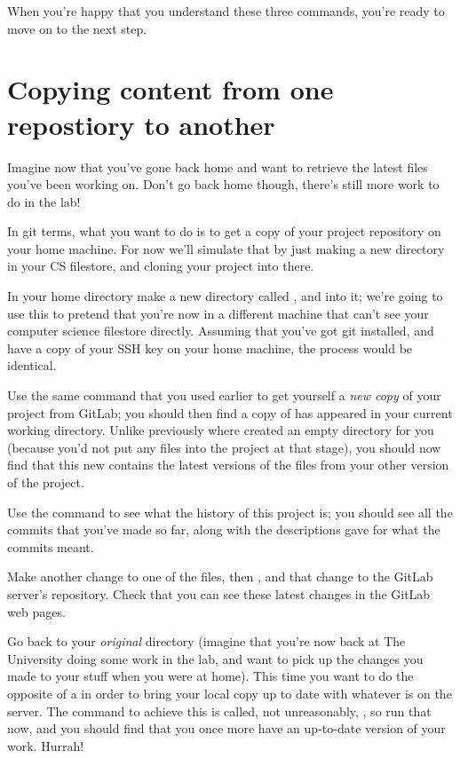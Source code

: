 When you're happy that you understand these three commands, you're ready to move on to the next step.

\section{Copying content from one repostiory to another}
Imagine now that you've gone back home and want to retrieve the latest files you've been working on. Don't go back home though, there's still more work to do in the lab! 

In git terms, what you want to do is to get a copy of your project repository on your home machine. For now we'll simulate that by just making a new directory in your CS filestore, and cloning your project into there. 

In your home directory make a new directory called , and  into it; we're going to use this to pretend that you're now in a different machine that can't see your computer science filestore directly. Assuming that you've got git installed, and have a copy of your SSH key on your home machine, the process would be identical.

Use the same  command that you used earlier to get yourself a \emph{new copy} of your  project from GitLab; you should then find a copy of  has appeared in your current working directory. Unlike previously where  created an empty directory for you (because you'd not put any files into the project at that stage), you should now find that this new  contains the latest versions of the files from your other version of the project.

Use the  command to see what the history of this project is; you should see all the commits that you've made so far, along with the descriptions gave for what the commits meant. 

Make another change to one of the files, then ,  and  that change to the GitLab server's repository. Check that you can see these latest changes in the GitLab web pages.

Go back to your \emph{original}  directory (imagine that you're now back at The University doing some work in the lab, and want to pick up the changes you made to your stuff when you were at home). This time you want to do the opposite of a  in order to bring your local copy up to date with whatever is on the server. The command to achieve this is called, not unreasonably, , so run that now, and you should find that you once more have an up-to-date version of your work. Hurrah!

